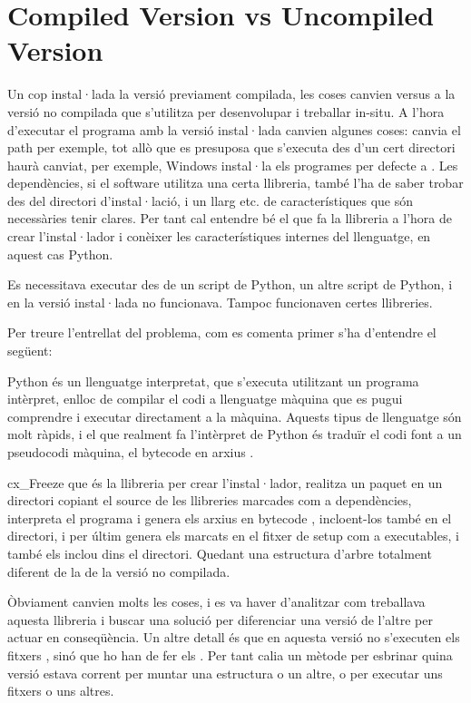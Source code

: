 \documentclass[letterpaper,11pt,catalan]{sphinxmanual}
\begin{document}
\section{Compiled Version vs Uncompiled Version}
\label{\detokenize{index:compiled-version-vs-uncompiled-version}}
Un cop instal·lada la versió previament compilada, les coses canvien versus a la versió
no compilada que s'utilitza per desenvolupar i treballar in-situ.
A l'hora d'executar el programa amb la versió instal·lada canvien algunes coses:
canvia el path per exemple, tot allò que es presuposa que s'executa des d'un cert directori haurà
canviat, per exemple, Windows instal·la els programes per defecte a . Les dependències,
si el software utilitza una certa llibreria, també l'ha de saber trobar des del directori d'instal·lació, i
un llarg etc. de característiques que són necessàries tenir clares. Per tant cal entendre bé el que fa la llibreria a l'hora
de crear l'instal·lador i conèixer les característiques internes del llenguatge, en aquest cas Python.

Es necessitava executar des de un script de Python, un altre script de Python, i en la versió
instal·lada no funcionava.
Tampoc funcionaven certes llibreries.

Per treure l'entrellat del problema, com es comenta primer s'ha d'entendre el següent:

Python és un llenguatge interpretat, que s'executa utilitzant un programa intèrpret, enlloc
de compilar el codi a llenguatge màquina que es pugui comprendre i executar directament
a la màquina. Aquests tipus de llenguatge són molt ràpids, i el que realment fa l'intèrpret
de Python és traduïr el codi font a un pseudocodi màquina, el bytecode en arxius .

cx\_Freeze que és la llibreria per crear l'instal·lador, realitza un paquet en un directori
copiant el source de les llibreries marcades com a dependències, interpreta el programa
i genera els arxius en bytecode , incloent-los també en el directori, i per
últim genera els  marcats en el fitxer de setup com a executables, i també
els inclou dins el directori. Quedant una estructura d'arbre totalment diferent de la
de la versió no compilada.

Òbviament canvien molts les coses, i es va haver d'analitzar com treballava aquesta llibreria
i buscar una solució per diferenciar una versió de l'altre per actuar en conseqüència.
Un altre detall és que en aquesta versió no s'executen els fitxers , sinó que
ho han de fer els . Per tant calia un mètode per esbrinar quina versió estava
corrent per muntar una estructura o un altre, o per executar uns fitxers o uns altres.
\end{document}
